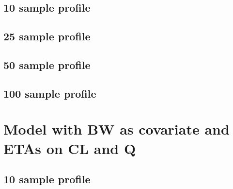 \subsection{10 sample profile}


\subsection{25 sample profile}


\subsection{50 sample profile}


\subsection{100 sample profile}



\section{Model with BW as covariate and ETAs on CL and Q}
\subsection{10 sample profile}
%
% 
% 
% 
% 
% 
% 
% 

